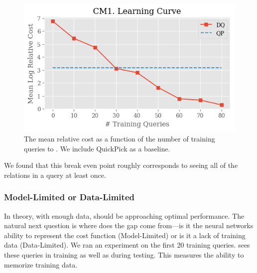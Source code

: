 \begin{figure}
    \centering
    \includegraphics[width=0.8\columnwidth]{exp/exp2_plot1.png}
    \caption{The mean relative cost as a function of the number of training queries to \sys. We include QuickPick as a baseline. \label{exp:plot2}}
\end{figure}

We found that this break even point roughly corresponds to seeing all of the relations in a query at least once.

\subsubsection{Model-Limited or Data-Limited}
In theory, with enough data, \sys should be approaching optimal performance.
The natural next question is where does the gap come from---is it the neural networks ability to represent the cost function (Model-Limited) or is it a lack of training data (Data-Limited).
We ran an experiment on the first 20 training queries. \sys sees these queries in training as well as during testing. This measures the ability to memorize training data.




